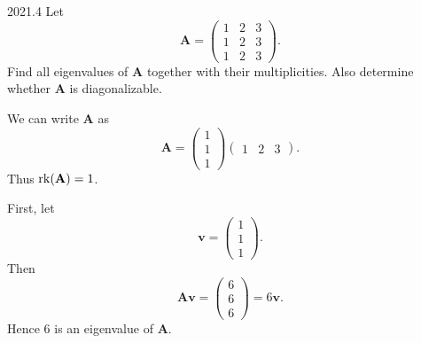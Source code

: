     \begin{pastproblem}{2021.4}
        Let
        \[
            \mathbf{A}
            =
            \begin{pmatrix}
                1 & 2 & 3 \\
                1 & 2 & 3 \\
                1 & 2 & 3
            \end{pmatrix}.
        \]
        Find all eigenvalues of $\mathbf{A}$ together with their multiplicities. Also determine
        whether $\mathbf{A}$ is diagonalizable.
    \end{pastproblem}

    \begin{solution}
        We can write $\mathbf{A}$ as
        \[
            \mathbf{A}
            =
            \begin{pmatrix}
                1 \\
                1 \\
                1
            \end{pmatrix}
            \begin{pmatrix}
                1 & 2 & 3
            \end{pmatrix}.
        \]
        Thus $\operatorname{rk}(\mathbf{A})=1$.

        First, let
        \[
            \mathbf{v}
            =
            \begin{pmatrix}
                1 \\
                1 \\
                1
            \end{pmatrix}.
        \]
        Then
        \[
            \mathbf{A}\mathbf{v}
            =
            \begin{pmatrix}
                6 \\
                6 \\
                6
            \end{pmatrix}
            =
            6\mathbf{v}.
        \]
        Hence $6$ is an eigenvalue of $\mathbf{A}$.


\end{solution}

